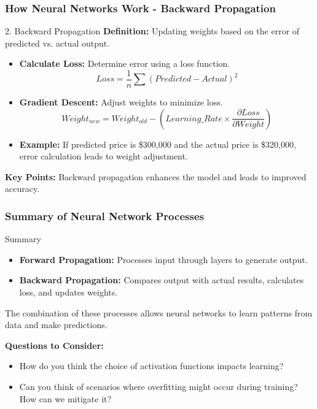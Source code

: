 \documentclass[aspectratio=169]{beamer}
\begin{document}
\begin{frame}[fragile]
    \frametitle{How Neural Networks Work - Backward Propagation}
    \begin{block}{2. Backward Propagation}
        \textbf{Definition:} Updating weights based on the error of predicted vs. actual output.
        \begin{itemize}
            \item \textbf{Calculate Loss:} Determine error using a loss function.
            \begin{equation}
                Loss = \frac{1}{n} \sum (Predicted - Actual)^2
            \end{equation}
            \item \textbf{Gradient Descent:} Adjust weights to minimize loss.
            \begin{equation}
                Weight_{new} = Weight_{old} - (Learning\_Rate \times \frac{\partial Loss}{\partial Weight})
            \end{equation}
            \item \textbf{Example:} If predicted price is \$300,000 and the actual price is \$320,000, error calculation leads to weight adjustment.
        \end{itemize}
        \textbf{Key Points:} Backward propagation enhances the model and leads to improved accuracy.
    \end{block}
\end{frame}

\begin{frame}[fragile]
    \frametitle{Summary of Neural Network Processes}
    \begin{block}{Summary}
        \begin{itemize}
            \item \textbf{Forward Propagation:} Processes input through layers to generate output.
            \item \textbf{Backward Propagation:} Compares output with actual results, calculates loss, and updates weights.
        \end{itemize}
        The combination of these processes allows neural networks to learn patterns from data and make predictions. 
    \end{block}
    
    \textbf{Questions to Consider:}
    \begin{itemize}
        \item How do you think the choice of activation functions impacts learning?
        \item Can you think of scenarios where overfitting might occur during training? How can we mitigate it?
    \end{itemize}
\end{frame}
\end{document}
